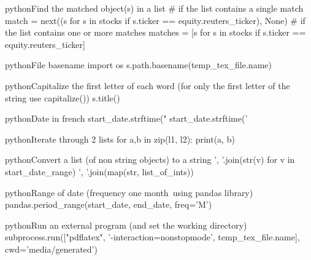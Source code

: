 \documentclass[10pt,a4paper]{article}
\begin{document}
\begin{multicols}{3}
\begin{codebox}{python}{Find the matched object(s) in a list}
# if the list contains a single match
match = next((s for s in stocks if s.ticker == equity.reuters_ticker), None)
# if the list contains one or more matches
matches = [s for s in stocks if s.ticker == equity.reuters_ticker]

\end{codebox}

\begin{codebox}{python}{File basename}
import os
s.path.basename(temp_tex_file.name)

\end{codebox}

\begin{codebox}{python}{Capitalize the first letter of each word (for only the first letter of the string use capitalize())}
s.title()

\end{codebox}

\begin{codebox}{python}{Date in french}
start_date.strftime("%
start_date.strftime('%

\end{codebox}

\begin{codebox}{python}{Iterate through 2 lists}
for a,b in zip(l1, l2):
        print(a, b)

\end{codebox}

\begin{codebox}{python}{Convert a list (of non string objects) to a string}
', '.join(str(v) for v in start_date_range)
', '.join(map(str, list_of_ints))

\end{codebox}

\begin{codebox}{python}{Range of date (frequency one month\, using pandas library)}
pandas.period_range(start_date, end_date, freq='M')

\end{codebox}

\begin{codebox}{python}{Run an external program (and set the working directory)}
subprocess.run(["pdflatex", '-interaction=nonstopmode', temp_tex_file.name],
                       cwd='media/generated')

\end{codebox}


\end{multicols}
\end{document}
